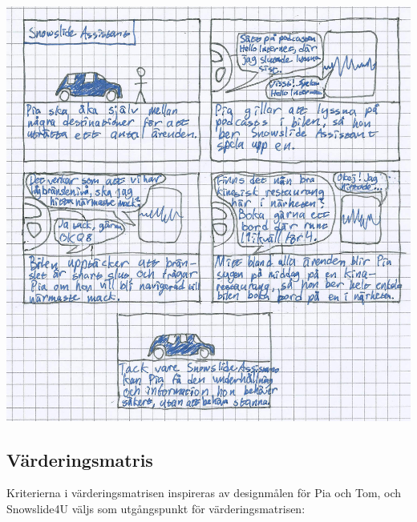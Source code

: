 \documentclass[a4paper,12pt,titlepage]{article}
\begin{document}
\begin{center}
\includegraphics[width=15cm]{images/assistant.jpg}
\end{center}

\newpage
\subsection*{Värderingsmatris}

Kriterierna i värderingsmatrisen inspireras av designmålen för Pia och Tom,
och Snowslide4U väljs som utgångspunkt för värderingsmatrisen:
\end{document}

